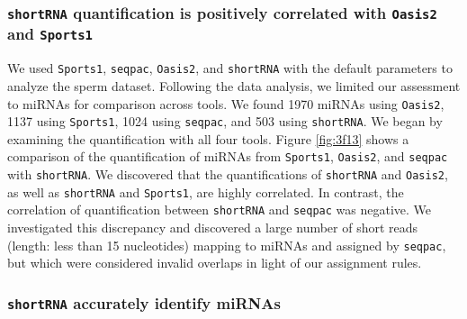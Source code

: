 \documentclass[12pt,twoside]{reedthesis}
\begin{document}
\hypertarget{shortrna-quantification-is-positively-correlated-with-oasis2-and-sports1}{%
\subsubsection{\texorpdfstring{\texttt{shortRNA} quantification is positively correlated with \texttt{Oasis2} and \texttt{Sports1}}{shortRNA quantification is positively correlated with Oasis2 and Sports1}}\label{shortrna-quantification-is-positively-correlated-with-oasis2-and-sports1}}

We used \texttt{Sports1}, \texttt{seqpac}, \texttt{Oasis2}, and \texttt{shortRNA} with the default
parameters to analyze the sperm dataset. Following the data analysis, we
limited our assessment to miRNAs for comparison across tools. We found
1970 miRNAs using \texttt{Oasis2}, 1137 using \texttt{Sports1}, 1024 using \texttt{seqpac}, and 503
using \texttt{shortRNA}. We began by examining the quantification with all four
tools. Figure \ref{fig:3f13} shows a comparison of the quantification of miRNAs from
\texttt{Sports1}, \texttt{Oasis2}, and \texttt{seqpac} with \texttt{shortRNA}. We discovered that the
quantifications of \texttt{shortRNA} and \texttt{Oasis2}, as well as \texttt{shortRNA} and \texttt{Sports1},
are highly correlated. In contrast, the correlation of quantification
between \texttt{shortRNA} and \texttt{seqpac} was negative. We investigated this
discrepancy and discovered a large number of short reads (length: less
than 15 nucleotides) mapping to miRNAs and assigned by \texttt{seqpac}, but which
were considered invalid overlaps in light of our assignment rules.



\hypertarget{shortrna-accurately-identify-mirnas}{%
\subsubsection{\texorpdfstring{\texttt{shortRNA} accurately identify miRNAs}{shortRNA accurately identify miRNAs}}\label{shortrna-accurately-identify-mirnas}}
\end{document}
